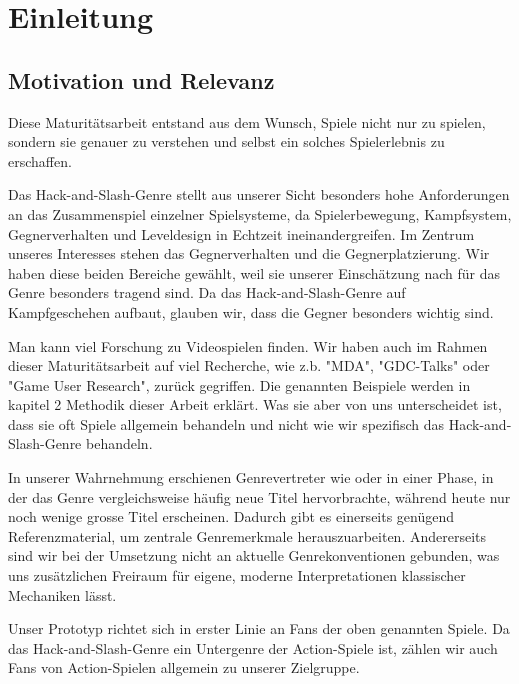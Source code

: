 \documentclass[../Main.tex]{subfiles}
\begin{document}
\section{Einleitung}

\subsection{Motivation und Relevanz}

Diese Maturitätsarbeit entstand aus dem Wunsch, Spiele nicht nur zu spielen, sondern sie genauer zu verstehen und selbst ein solches Spielerlebnis zu erschaffen.

Das Hack-and-Slash-Genre stellt aus unserer Sicht besonders hohe Anforderungen an das Zusammenspiel einzelner Spielsysteme, da Spielerbewegung, Kampfsystem, Gegnerverhalten und Leveldesign in Echtzeit ineinandergreifen. Im Zentrum unseres Interesses stehen das Gegnerverhalten und die Gegnerplatzierung. Wir haben diese beiden Bereiche gewählt, weil sie unserer Einschätzung nach für das Genre besonders tragend sind. Da das Hack-and-Slash-Genre auf Kampfgeschehen aufbaut, glauben wir, dass die Gegner besonders wichtig sind.

Man kann viel Forschung zu Videospielen finden. Wir haben auch im Rahmen dieser Maturitätsarbeit auf viel Recherche, wie z.b. "MDA", "GDC-Talks" oder "Game User Research", zurück gegriffen. Die genannten Beispiele werden in kapitel 2 Methodik dieser Arbeit erklärt. Was sie aber von uns unterscheidet ist, dass sie oft Spiele allgemein behandeln und nicht wie wir spezifisch das Hack-and-Slash-Genre behandeln.

In unserer Wahrnehmung erschienen Genrevertreter wie  oder  in einer Phase, in der das Genre vergleichsweise häufig neue Titel hervorbrachte, während heute nur noch wenige grosse Titel erscheinen. Dadurch gibt es einerseits genügend Referenzmaterial, um zentrale Genremerkmale herauszuarbeiten. Andererseits sind wir bei der Umsetzung nicht an aktuelle Genrekonventionen gebunden, was uns zusätzlichen Freiraum für eigene, moderne Interpretationen klassischer Mechaniken lässt.

Unser Prototyp richtet sich in erster Linie an Fans der oben genannten Spiele. Da das Hack-and-Slash-Genre ein Untergenre der Action-Spiele ist, zählen wir auch Fans von Action-Spielen allgemein zu unserer Zielgruppe.
\end{document}
